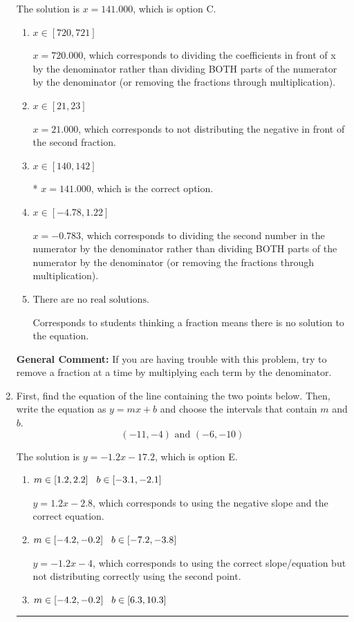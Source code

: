\documentclass{extbook}[14pt]
\newcommand{\litem}[1]{\item #1

\rule{\textwidth}{0.4pt}}
\begin{document}
\begin{enumerate}
{The solution is \( x = 141.000 \), which is option C.\begin{enumerate}[label=\Alph*.]
\item \( x \in [720, 721] \)

 $x = 720.000$, which corresponds to dividing the coefficients in front of x by the denominator rather than dividing BOTH parts of the numerator by the denominator (or removing the fractions through multiplication).
\item \( x \in [21, 23] \)

 $x = 21.000$, which corresponds to not distributing the negative in front of the second fraction.
\item \( x \in [140, 142] \)

* $x = 141.000$, which is the correct option.
\item \( x \in [-4.78, 1.22] \)

 $x = -0.783$, which corresponds to dividing the second number in the numerator by the denominator rather than dividing BOTH parts of the numerator by the denominator (or removing the fractions through multiplication).
\item \( \text{There are no real solutions.} \)

Corresponds to students thinking a fraction means there is no solution to the equation.
\end{enumerate}

\textbf{General Comment:} If you are having trouble with this problem, try to remove a fraction at a time by multiplying each term by the denominator.
}
\litem{
First, find the equation of the line containing the two points below. Then, write the equation as $ y=mx+b $ and choose the intervals that contain $m$ and $b$.
\[ (-11, -4) \text{ and } (-6, -10) \]

The solution is \( y = -1.2x -17.2 \), which is option E.\begin{enumerate}[label=\Alph*.]
\item \( m \in [1.2, 2.2] \hspace*{3mm} b \in [-3.1, -2.1] \)

 $y = 1.2x -2.8$, which corresponds to using the negative slope and the correct equation.
\item \( m \in [-4.2, -0.2] \hspace*{3mm} b \in [-7.2, -3.8] \)

 $y = -1.2x -4$, which corresponds to using the correct slope/equation but not distributing correctly using the second point.
\item \( m \in [-4.2, -0.2] \hspace*{3mm} b \in [6.3, 10.3] \)


\end{enumerate}}
\end{enumerate}
\end{document}
